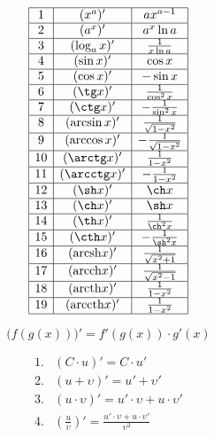 \documentclass{article}
\newcommand{\arcsh}{\mathrm{arcsh}}
\newcommand{\arcch}{\mathrm{arcch}}
\newcommand{\arcth}{\mathrm{arcth}}
\newcommand{\arccth}{\mathrm{arccth}}
\begin{document}
\begin{displaymath}
\begin{array}{|c|c|c|}

  \hline
  1 &   (x^{a})'        & ax^{a-1}\\
  \hline
  2 &   (a^{x})'        & a^{x}\ln a\\
  \hline
  3 &   (\log_{a}x)'    & \frac{1}{x\ln a}\\
  \hline
  4 &   (\sin x)'       & \cos x\\
  \hline
  5 &   (\cos x)'       & -\sin x\\
  \hline
  6 &   (\tg x)'        & \frac{1}{\cos^{2} x}\\
  \hline
  7 &   (\ctg x)'       & -\frac{1}{\sin^{2} x}\\
  \hline
  8 &   (\arcsin x)'    & \frac{1}{\sqrt{1-x^{2}}}\\
  \hline
  9 &   (\arccos x)'    & -\frac{1}{\sqrt{1-x^{2}}}\\
  \hline
  10& (\arctg x)'       & \frac{1}{1-x^{2}}\\
  \hline
  11& (\arcctg x)'      & -\frac{1}{1-x^{2}}\\
  \hline
  12& (\sh x)'          & \ch x\\
  \hline
  13& (\ch x)'          & \sh x\\
  \hline
  14& (\th x)'          & \frac{1}{\ch^{2} x}\\
  \hline
  15& (\cth x)'         & -\frac{1}{\sh^{2} x}\\
  \hline
  16& (\arcsh x)'       & \frac{1}{\sqrt{x^{2}+1}}\\
  \hline
  17& (\arcch x)'       & \frac{1}{\sqrt{x^{2}-1}}\\
  \hline
  18& (\arcth x)'       & \frac{1}{1-x^{2}}\\
  \hline
  19& (\arccth x)'      & \frac{1}{1-x^{2}}\\
  \hline

\end{array}
\end{displaymath}

\[   \Big(f(g(x))\Big) ' = f'(g(x)) \cdot g'(x)  \]

\begin{displaymath}
\begin{array}{cl}

  1.&  (C\cdot u)'                         =   C\cdot u'\\
  2.&  \left(u + \upsilon       \right)'   =   u' + \upsilon'\\
  3.&  \left(u\cdot \upsilon    \right)'   =   u'\cdot\upsilon + u\cdot\upsilon' \\
  4.&  \left(\frac{u}{\upsilon} \right)'   =   \frac{u'\cdot\upsilon + u\cdot\upsilon'}{\upsilon^2}\\

\end{array}
\end{displaymath}
\end{document}
